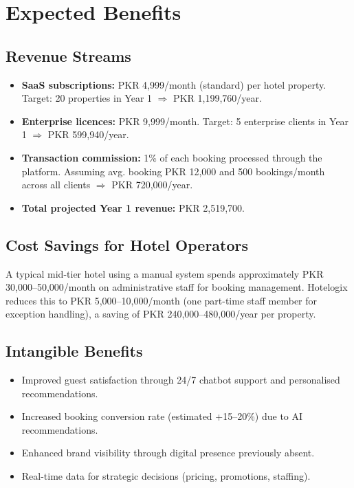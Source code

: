 \documentclass[12pt,a4paper]{report}
\begin{document}
\section{Expected Benefits}

\subsection*{Revenue Streams}
\begin{itemize}[leftmargin=*, label=\textbullet]
  \item \textbf{SaaS subscriptions:} PKR 4,999/month (standard) per hotel property. Target: 20 properties in Year 1 $\Rightarrow$ PKR 1,199,760/year.
  \item \textbf{Enterprise licences:} PKR 9,999/month. Target: 5 enterprise clients in Year 1 $\Rightarrow$ PKR 599,940/year.
  \item \textbf{Transaction commission:} 1\% of each booking processed through the platform. Assuming avg. booking PKR 12,000 and 500 bookings/month across all clients $\Rightarrow$ PKR 720,000/year.
  \item \textbf{Total projected Year 1 revenue:} PKR 2,519,700.
\end{itemize}

\subsection*{Cost Savings for Hotel Operators}
A typical mid-tier hotel using a manual system spends approximately PKR 30,000--50,000/month on administrative staff for booking management. Hotelogix reduces this to PKR 5,000--10,000/month (one part-time staff member for exception handling), a saving of PKR 240,000--480,000/year per property.

\subsection*{Intangible Benefits}
\begin{itemize}[leftmargin=*, label=\textbullet]
  \item Improved guest satisfaction through 24/7 chatbot support and personalised recommendations.
  \item Increased booking conversion rate (estimated +15--20\%) due to AI recommendations.
  \item Enhanced brand visibility through digital presence previously absent.
  \item Real-time data for strategic decisions (pricing, promotions, staffing).
\end{itemize}
\end{document}
